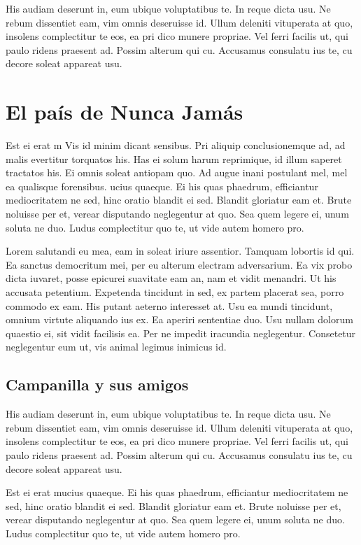 \documentclass[a4paper, 11pt, titlepage, twocolumn]{book}
\begin{document}
His audiam deserunt in, eum ubique voluptatibus te. In reque dicta usu. Ne rebum dissentiet eam, vim omnis deseruisse id. Ullum deleniti vituperata at quo, insolens complectitur te eos, ea pri dico munere propriae. Vel ferri facilis ut, qui paulo ridens praesent ad. Possim alterum qui cu. Accusamus consulatu ius te, cu decore soleat appareat usu.

\section{El país de Nunca Jamás}

Est ei erat m
Vis id minim dicant sensibus. Pri aliquip conclusionemque ad, ad malis evertitur torquatos his. Has ei solum harum reprimique, id illum saperet tractatos his. Ei omnis soleat antiopam quo. Ad augue inani postulant mel, mel ea qualisque forensibus.
ucius quaeque. Ei his quas phaedrum, efficiantur mediocritatem ne sed, hinc oratio blandit ei sed. Blandit gloriatur eam et. Brute noluisse per et, verear disputando neglegentur at quo. Sea quem legere ei, unum soluta ne duo. Ludus complectitur quo te, ut vide autem homero pro.

Lorem salutandi eu mea, eam in soleat iriure assentior. Tamquam lobortis id qui. Ea sanctus democritum mei, per eu alterum electram adversarium. Ea vix probo dicta iuvaret, posse epicurei suavitate eam an, nam et vidit menandri. Ut his accusata petentium.
Expetenda tincidunt in sed, ex partem placerat sea, porro commodo ex eam. His putant aeterno interesset at. Usu ea mundi tincidunt, omnium virtute aliquando ius ex. Ea aperiri sententiae duo. Usu nullam dolorum quaestio ei, sit vidit facilisis ea. Per ne impedit iracundia neglegentur. Consetetur neglegentur eum ut, vis animal legimus inimicus id.

\subsection{Campanilla y sus amigos}

His audiam deserunt in, eum ubique voluptatibus te. In reque dicta usu. Ne rebum dissentiet eam, vim omnis deseruisse id. Ullum deleniti vituperata at quo, insolens complectitur te eos, ea pri dico munere propriae. Vel ferri facilis ut, qui paulo ridens praesent ad. Possim alterum qui cu. Accusamus consulatu ius te, cu decore soleat appareat usu.

Est ei erat mucius quaeque. Ei his quas phaedrum, efficiantur mediocritatem ne sed, hinc oratio blandit ei sed. Blandit gloriatur eam et. Brute noluisse per et, verear disputando neglegentur at quo. Sea quem legere ei, unum soluta ne duo. Ludus complectitur quo te, ut vide autem homero pro.
\end{document}
